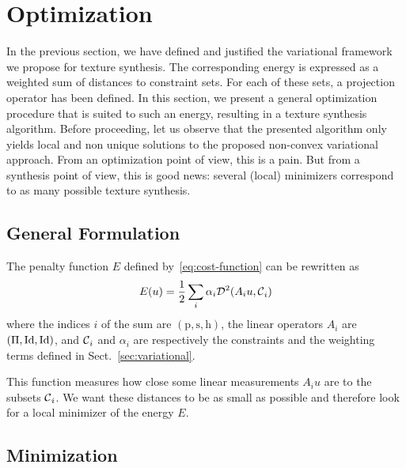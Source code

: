 \section{Optimization}
\label{sec:framework}

\newcommand{\uo}[0]{u^{(0)}}
\newcommand{\uinf}[0]{u^{(\infty)}}

In the previous section, we have defined and justified the variational framework we propose for texture synthesis.
The corresponding energy is expressed as a weighted sum of distances to constraint sets.
For each of these sets, a projection operator has been defined.
In this section, we present a general optimization procedure that is suited to such an energy, resulting in a texture synthesis algorithm.
Before proceeding, let us observe that the presented algorithm only yields local and non unique solutions to the proposed non-convex variational approach.
From an optimization point of view, this is a pain.
But from a synthesis point of view, this is good news: several (local) minimizers correspond to as many possible texture synthesis.


\subsection{General Formulation}
\label{sub:formulation}
\newcommand{\Ci}[0]{{{\constr{}}_i}}
The penalty function $E$ defined by~\eqref{eq:cost-function} can be rewritten as
\begin{equation}
  \label{eq:sum-proj}
  E(u) = \frac{1}{2} \sum_i \alpha_i \dist^2(A_i u,\Ci)
\end{equation}
where the indices $i$ of the sum are $(\mathrm{p},\mathrm{s},\mathrm{h})$, the linear operators $A_i$ are $(\Pi,\operatorname*{Id},\operatorname*{Id})$, and ${\mathcal{C}_{\mathrm{}}}_i$ and $\alpha_i$ are respectively the constraints and the weighting terms defined in Sect.~\ref{sec:variational}.

This function measures how close some linear measurements $A_i u$ are to the subsets $\Ci$.
We want these distances to be as small as possible and therefore look for a local minimizer of the energy $E$.


\subsection{Minimization}
\label{sub:minimization}

